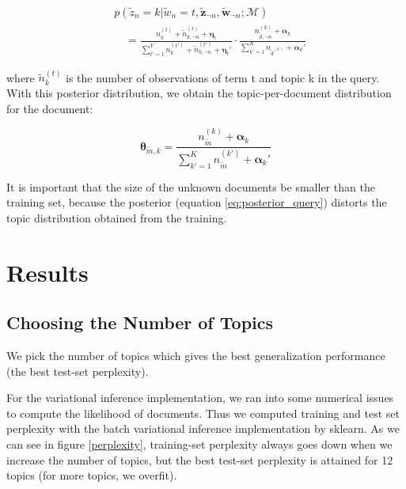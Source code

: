 \documentclass{article}
\begin{document}
\begin{align}\label{eq:posterior_query}
& p(\tilde{z}_n=k|\tilde{w}_n=t, \tilde{\mathbf{z}}_{\neg n},\tilde{\mathbf{w}}_{\neg n};\bm{\mathcal{M}}) \nonumber\\
& \quad = \frac{n_k ^{(t)} + \tilde{n}_{k, \neg n} ^{(t)} + \bm{\eta}_t}{\sum_{t'=1}^V n_k ^{(t')} + \tilde{n}_{k, \neg n} ^{(t')} + \bm{\eta}_t'} \cdot \frac{n_{\tilde{d},\neg n}^{(k)} + \bm{\alpha}_k}{\sum_{k'=1}^K n_{\tilde{d}^{(k')}} + \bm{\alpha}_k'}
\end{align}

where $\tilde{n}_k ^{(t)}$ is the number of observations of term t and topic k in the query. With this posterior distribution, we obtain the topic-per-document distribution for the document:

\begin{equation}
\bm{\theta}_{\tilde{m},k} = \frac{n_{\tilde{m}}^{(k)} + \bm{\alpha}_k}{\sum_{k'=1}^K n_{\tilde{m}}^{(k')} + \bm{\alpha}_k'}
\end{equation}

It is important that the size of the unknown documents be smaller than the training set, because the posterior (equation \ref{eq:posterior_query}) distorts the topic distribution obtained from the training.

\section{Results}

\subsection{Choosing the Number of Topics}
We pick the number of topics which gives the best generalization performance (the best test-set perplexity). 

For the variational inference implementation, we ran into some numerical issues to compute the likelihood of documents. Thus we computed training and test set perplexity with the batch variational inference implementation by sklearn. As we can see in figure \ref{perplexity}, training-set perplexity always goes down when we increase the number of topics, but the best test-set perplexity is attained for 12 topics (for more topics, we overfit).
\end{document}
